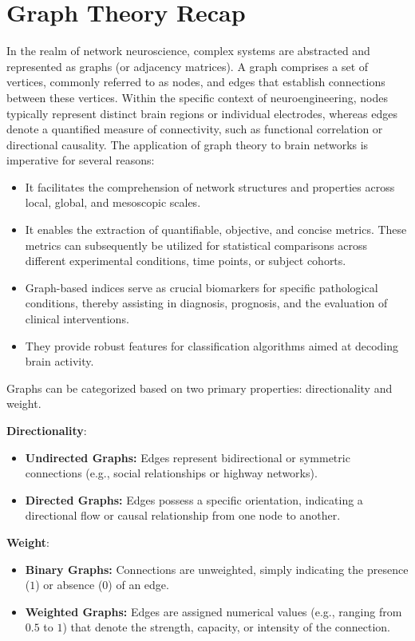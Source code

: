 \documentclass[10pt, letterpaper]{report}
\begin{document}
\section{Graph Theory Recap}
In the realm of network neuroscience, complex systems are abstracted and represented as graphs (or adjacency matrices). A graph comprises a set of vertices, commonly referred to as nodes, and edges that establish connections between these vertices. Within the specific context of neuroengineering, nodes typically represent distinct brain regions or individual electrodes, whereas edges denote a quantified measure of connectivity, such as functional correlation or directional causality.
The application of graph theory to brain networks is imperative for several reasons:
\begin{itemize}
    \item It facilitates the comprehension of network structures and properties across local, global, and mesoscopic scales.
    \item It enables the extraction of quantifiable, objective, and concise metrics. These metrics can subsequently be utilized for statistical comparisons across different experimental conditions, time points, or subject cohorts.
    \item Graph-based indices serve as crucial biomarkers for specific pathological conditions, thereby assisting in diagnosis, prognosis, and the evaluation of clinical interventions.
    \item They provide robust features for classification algorithms aimed at decoding brain activity.
\end{itemize}
Graphs can be categorized based on two primary properties: directionality and weight.\bigskip

\noindent \textbf{Directionality}:
\begin{itemize}
    \item \textbf{Undirected Graphs:} Edges represent bidirectional or symmetric connections (e.g., social relationships or highway networks).
    \item \textbf{Directed Graphs:} Edges possess a specific orientation, indicating a directional flow or causal relationship from one node to another.
\end{itemize}

\noindent \textbf{Weight}:
\begin{itemize}
    \item \textbf{Binary Graphs:} Connections are unweighted, simply indicating the presence ($1$) or absence ($0$) of an edge.
    \item \textbf{Weighted Graphs:} Edges are assigned numerical values (e.g., ranging from $0.5$ to $1$) that denote the strength, capacity, or intensity of the connection.
\end{itemize}
\end{document}
